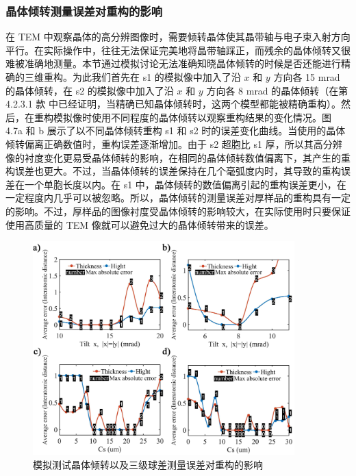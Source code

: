 \subsubsection{晶体倾转测量误差对重构的影响}
在 TEM 中观察晶体的高分辨图像时，需要倾转晶体使其晶带轴与电子束入射方向平行。在实际操作中，往往无法保证完美地将晶带轴踩正，而残余的晶体倾转又很难被准确地测量。本节通过模拟讨论无法准确知晓晶体倾转的时候是否还能进行精确的三维重构。为此我们首先在 s1 的模拟像中加入了沿 $x$ 和 $y$ 方向各 15 mrad 的晶体倾转，在 s2 的模拟像中加入了沿 $x$ 和 $y$ 方向各 8 mrad 的晶体倾转（在第 4.2.3.1 款 中已经证明，当精确已知晶体倾转时，这两个模型都能被精确重构）。然后，在重构模拟像时使用不同程度的晶体倾转以观察重构结果的变化情况。图 4.7a 和 b 展示了以不同晶体倾转重构 s1 和 s2 时的误差变化曲线。当使用的晶体倾转偏离正确数值时，重构误差逐渐增加。由于 s2 超胞比 s1 厚，所以其高分辨像的衬度变化更易受晶体倾转的影响，在相同的晶体倾转数值偏离下，其产生的重构误差也更大。不过，当晶体倾转的误差保持在几个毫弧度内时，其导致的重构误差在一个单胞长度以内。在 s1 中，晶体倾转的数值偏离引起的重构误差更小，在一定程度内几乎可以被忽略。所以，晶体倾转的测量误差对厚样品的重构具有一定的影响。不过，厚样品的图像衬度受晶体倾转的影响较大，在实际使用时只要保证使用高质量的 TEM 像就可以避免过大的晶体倾转带来的误差。
\begin{figure}[htbp]
	\vspace{\baselineskip}
	\centering
	\includegraphics[width=0.9\textwidth]{../2.6/26}
	\caption{模拟测试晶体倾转以及三级球差测量误差对重构的影响}\label{fig:26}
	\song{}
\end{figure}

